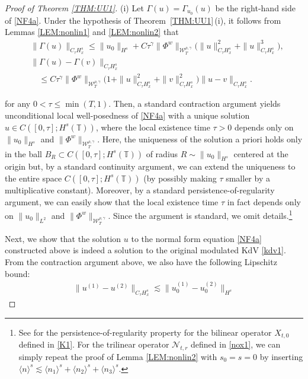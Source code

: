 \documentclass[letterpaper, 11pt,  reqno]{amsart}
\newcommand{\1}{\hspace{0.5mm}\text{I}\hspace{0.5mm}}
\newcommand{\noi}{\noindent}
\newcommand{\T}{\mathbb{T}}
\newcommand{\g}{\gamma}
\newcommand{\G}{\Gamma}
\newcommand{\les}{\lesssim}
\newcommand{\jb}[1]
{\langle #1 \rangle}
\newcommand{\NN}{\mathcal{N}}
\newcommand{\W}{\mathcal{W}}
\numberwithin{equation}{section}
\numberwithin{theorem}{section}
\begin{document}
\begin{proof}[Proof of Theorem \ref{THM:UU1}]
(i) Let $\G(u) = \G_{u_0}(u)$ be the right-hand side of \eqref{NF4a}.
Under the hypothesis of Theorem~\ref{THM:UU1}\,(i), 
it follows from 
 Lemmas \ref{LEM:nonlin1} and 
\ref{LEM:nonlin2}
that 
\begin{align*}
& \| \G(u) \|_{C_\tau H^s_x}
 \le \| u_0\|_{H^s}
+ C\tau^\g
  \|\Phi^w\|_{  \W^{\rho,\g}_T} 
  \Big(\|u\|_{C_\tau H^s_x}^2 + \|u\|_{C_\tau H^s_x}^3\Big),\\
& \| \G(u)  - \G(v) \|_{C_\tau  H^s_x}\\
& \quad \le 
 C\tau^\g
  \|\Phi^w\|_{  \W^{\rho,\g}_T} 
\Big(1+ \|u\|_{C_\tau H^s_x}^2 + \|v\|_{C_\tau H^s_x}^2\Big) 
\|u- v \|_{C_\tau H^s_x}.
\end{align*}


\noi
for any $0 < \tau \le \min(T, 1)$.
Then, 
 a standard contraction argument
yields unconditional  local well-posedness
of \eqref{NF4a}
with a unique solution $u \in C([0, \tau]; H^s(\T))$, 
where the local existence time 
$\tau > 0$
depends only on 
$\|u_0\|_{H^s}$ and   $\|\Phi^w\|_{  \W^{\rho,\g}_T} $.
Here, the uniqueness of the solution a priori holds only in the ball 
$B_R \subset C([0, \tau]; H^s(\T))$
of radius $R \sim \|u_0\|_{H^s}$ centered at the origin
but, by a standard continuity argument, 
we can extend the uniqueness to the entire space $C([0, \tau]; H^s(\T))$
(by possibly making $\tau$ smaller by a multiplicative constant).
Moreover, by a standard persistence-of-regularity argument, 
we can easily show that the local existence time $\tau$
in fact depends only on 
$\|u_0\|_{L^2}$ and   $\|\Phi^w\|_{  \W^{\rho,\g}_T} $.
Since the argument is standard, we omit details.\footnote{See \cite[Proposition 4.1\,(i)]{CGLLO1}
for the persistence-of-regularity property for the bilinear operator $X_{t, 0}$ defined in \eqref{K1}.
For the trilinear operator $\NN_{t, r}$ defined in \eqref{nox1}, 
we can simply repeat the proof of Lemma \ref{LEM:nonlin2}
with $s_0 = s = 0$
by inserting $\jb{n}^s \les \jb{n_1}^s + \jb{n_2}^s+ \jb{n_3}^s$.
}




Next, we show that the solution $u$ to the normal form equation \eqref{NF4a}
constructed above 
is indeed a solution to the original modulated KdV \eqref{kdv1}.
From the contraction argument above, 
we also have the following Lipschitz bound:
\begin{align}
\| u^{(1)} - u^{(2)}\|_{C_\tau H^s_x}
\les \| u_0^{(1)} - u_0^{(2)}\|_{H^s}
\label{NF4c}
\end{align}


\end{proof}
\end{document}
